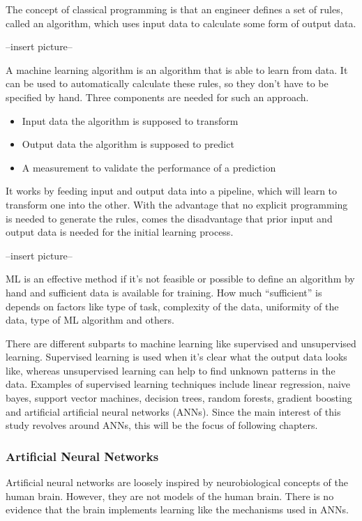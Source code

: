 The concept of classical programming is that an engineer defines a set of rules, called an algorithm, which uses input data to calculate some form of output data\cite{Chollet2017}.

--insert picture--

A machine learning algorithm is an algorithm that is able to learn from data\cite{Goodfellow2016}. It can be used to automatically calculate these rules, so they don't have to be specified by hand. Three components are needed for such an approach.

\begin{itemize}
\item Input data the algorithm is supposed to transform
\item Output data the algorithm is supposed to predict
\item A measurement to validate the performance of a prediction
\end{itemize}

It works by feeding input and output data into a pipeline, which will learn to transform one into the other. With the advantage that no explicit programming is needed to generate the rules, comes the disadvantage that prior input and output data is needed for the initial learning process.

--insert picture--

ML is an effective method if it's not feasible or possible to define an algorithm by hand and sufficient data is available for training. How much “sufficient” is depends on factors like type of task, complexity of the data, uniformity of the data, type of ML algorithm and others.

There are different subparts to machine learning like supervised and unsupervised learning. Supervised learning is used when it's clear what the output data looks like, whereas unsupervised learning can help to find unknown patterns in the data. Examples of supervised learning techniques include linear regression, naive bayes, support vector machines, decision trees, random forests, gradient boosting and artificial artificial neural networks (ANNs). Since the main interest of this study revolves around ANNs, this will be the focus of following chapters.

\subsubsection{Artificial Neural Networks}

Artificial neural networks are loosely inspired by neurobiological concepts of the human brain. However, they are not models of the human brain. There is no evidence that the brain implements learning like the mechanisms used in ANNs\cite{Chollet2017}.

